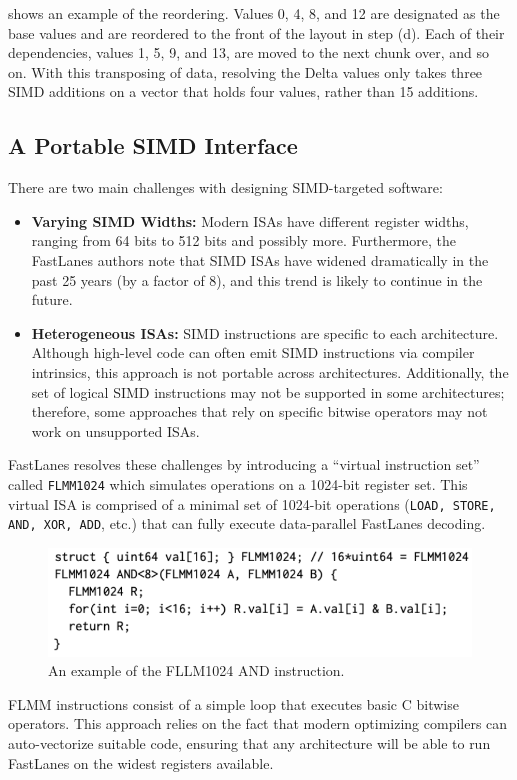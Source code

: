\documentclass[11pt]{article}
\begin{document}
 shows an example of the reordering. Values 0, 4, 8, and 12 are designated as the base values and are reordered to the front of the layout in step (d). Each of their dependencies, values 1, 5, 9, and 13, are moved to the next chunk over, and so on. With this transposing of data, resolving the Delta values only takes three SIMD additions on a vector that holds four values, rather than 15 additions.

\subsection{A Portable SIMD Interface}
There are two main challenges with designing SIMD-targeted software:
\begin{itemize}
    \item \textbf{Varying SIMD Widths:} Modern ISAs have different register widths, ranging from 64 bits to 512 bits and possibly more. Furthermore, the FastLanes authors note that SIMD ISAs have widened dramatically in the past 25 years (by a factor of 8), and this trend is likely to continue in the future.
    \item \textbf{Heterogeneous ISAs:} SIMD instructions are specific to each architecture. Although high-level code can often emit SIMD instructions via compiler intrinsics, this approach is not portable across architectures. Additionally, the set of logical SIMD instructions may not be supported in some architectures; therefore, some approaches that rely on specific bitwise operators may not work on unsupported ISAs.
\end{itemize}
FastLanes resolves these challenges by introducing a ``virtual instruction set'' called \texttt{FLMM1024} which simulates operations on a 1024-bit register set. This virtual ISA is comprised of a minimal set of 1024-bit operations (\texttt{LOAD, STORE, AND, XOR, ADD}, etc.) that can fully execute data-parallel FastLanes decoding.

\begin{figure}[H]
    \centering
    \includegraphics[width=0.6\linewidth]{fig/flmm-code.pdf}
    \caption{An example of the FLLM1024 AND instruction.}\label{fig:flmm-code}
\end{figure}

FLMM instructions consist of a simple loop that executes basic C bitwise operators. This approach relies on the fact that modern optimizing compilers can auto-vectorize suitable code, ensuring that any architecture will be able to run FastLanes on the widest registers available.
\end{document}
